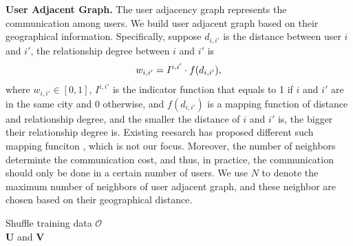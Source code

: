 \textbf{User Adjacent Graph. }
The user adjacency graph represents the communication among users. 
We build user adjacent graph based on their geographical information. 
Specifically, suppose %
$d_{i,i'}$ is the distance between user $i$ and $i'$, 
the relationship degree between $i$ and $i'$ is 
\begin{equation}
w_{i,i'} = I^{i,i'} \Large \cdot f(d_{i,i'}),
\end{equation} 
where $w_{i,i'} \in [0,1]$, $I^{i,i'}$ is the indicator function that equals to 1 if $i$ and $i'$ are in the same city and 0 otherwise, and $f(d_{i,i'})$ is a mapping function of distance and relationship degree, and the smaller the distance of $i$ and $i'$ is, the bigger their relationship degree is. 
Existing reesarch has proposed different such mapping funciton \cite{zhao2016survey}, which is not our focus. 
Moreover, the number of neighbors determinte the communication cost, and thus, in practice, the communication should only be done in a certain number of users. 
We use $N$ to denote the maximum number of neighbors of user adjacent graph, and these neighbor are chosen based on their geographical distance. 

\begin{algorithm*}[t]
\caption{Nearby Collaborative DMF Optimization Framework}\label{dmflearning}
{
	Shuffle training data $\mathcal{O}$\\
}
\Return $\textbf{U}$ and $\textbf{V}$
\end{algorithm*}


